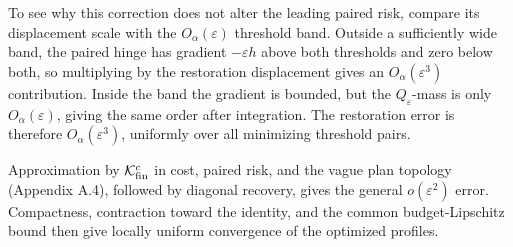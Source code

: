 To see why this correction does not alter the leading paired risk, compare its displacement scale with the \(O_\alpha(\varepsilon)\) threshold band. Outside a sufficiently wide band, the paired hinge has gradient \(-\varepsilon h\) above both thresholds and zero below both, so multiplying by the restoration displacement gives an \(O_\alpha(\varepsilon^3)\) contribution. Inside the band the gradient is bounded, but the \(Q_\varepsilon\)-mass is only \(O_\alpha(\varepsilon)\), giving the same order after integration. The restoration error is therefore \(O_\alpha(\varepsilon^3)\), uniformly over all minimizing threshold pairs.

Approximation by \(\mathcal K_{\rm fin}^c\) in cost, paired risk, and the vague plan topology (Appendix A.4), followed by diagonal recovery, gives the general \(o(\varepsilon^2)\) error. Compactness, contraction toward the identity, and the common budget-Lipschitz bound then give locally uniform convergence of the optimized profiles.
